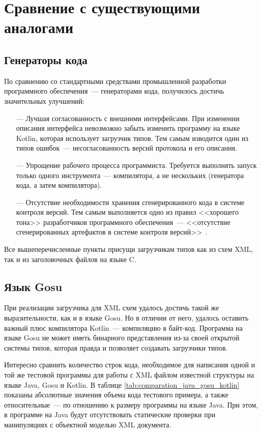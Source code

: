 \section{Сравнение с существующими аналогами}

\subsection{Генераторы кода}\label{res:generators}
По сравнению со стандартными средствами промышленной разработки программного обеспечения~--- генераторами кода,
получилось достичь значительных улучшений:
\begin{itemize}
	\item[---] Лучшая согласованность с внешними интерфейсами. При изменении описания интерфейса невозможно забыть изменить программу на языке Kotlin, которая использует загрузчик типов. Тем самым изводится один из типов ошибок~--- несогласованность версий протокола и его описания.
	\item[---] Упрощение рабочего процесса программиста. Требуется выполнять запуск только одного инструмента~--- компилятора, а не нескольких (генератора кода, а затем компилятора).
	\item[---] Отсутствие необходимости хранения сгенерированного кода в системе контроля версий. Тем самым выполняется одно из правил <<хорошего тона>> разработчиков программного обеспечения~--- <<отсутствие сгенерированных артефактов в системе контроля версий>>~\cite{art-of-agile}.
\end{itemize}

Все вышеперечисленные пункты присущи загрузчикам типов как из схем XML, так и из заголовочных файлов на языке C.

\subsection{Язык Gosu}\label{xml-gosu-result}
При реализации загрузчика для XML схем удалось достичь такой же выразительности, как и в языке Gosu.
Но в отличии от него, удалось оставить важный плюс компилятора Kotlin~--- компиляцию в байт-код.
Программа на языке Gosu не может иметь бинарного представления из-за своей открытой системы типов,
которая правда и позволяет создавать загрузчики типов.

Интересно сравнить количество строк кода, необходимое для написания одной и той же тестовой программы для работы с XML файлом известной структуры на языке Java, Gosu и Kotlin. В таблице \ref{tab:comparation_java_gosu_kotlin} показаны абсолютные значения объема кода тестового примера, а также относительные~--- по отношению к размеру программы на языке Java.
При этом, в программе на Java будут отсутствовать статические проверки при манипуляциях с объектной моделью XML документа.


